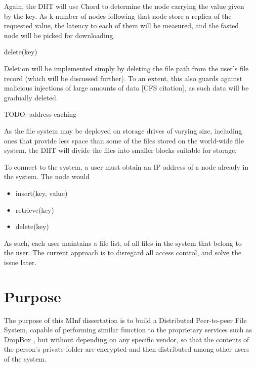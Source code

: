 \documentclass[a4paper, 11pt]{article}
\begin{document}
Again, the DHT will use Chord to determine the node carrying the value given by the key. As k number of nodes following that node store a replica of the requested value, the latency to each of them will be measured, and the fasted node will be picked for downloading.

delete(key)

Deletion will be implemented simply by deleting the file path from the user's file record (which will be discussed further). To an extent, this also guards against malicious injections of large amounts of data [CFS citation], as such data will be gradually deleted.

TODO: address caching

As the file system may be deployed on storage drives of varying size,  including ones that provide less space than some of the files stored on the world-wide file system, the DHT will divide the files into smaller blocks suitable for storage. 

To connect to the system, a user must obtain an IP address of a node already in the system. The node would 



\begin{itemize}
\item insert(key, value)
\item retrieve(key)
\item delete(key)
\end{itemize}



 As such, each user maintains a file list, of all files in
the system that belong to the user.
The current approach is to disregard all access control, and solve the issue later.


\section{Purpose}
The purpose of this MInf dissertation is to build a Distributed Peer-to-peer File System, capable of performing similar function to the proprietary services such as DropBox \cite{dropbox}, but without depending on any specific vendor, so that the contents of the person's private folder are encrypted and then distributed among other users of the system. 
\end{document}
